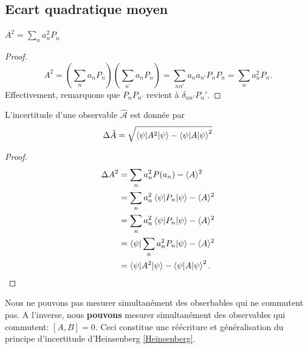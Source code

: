 \documentclass[../notesdecours.tex]{subfiles}
\begin{document}
\subsection{Ecart quadratique moyen}
\begin{lemma}
$A^2 = \sum_n a_n^2P_n$
\end{lemma}
\begin{proof}
\begin{equation*}
A^2 = (\sum_n a_nP_n)(\sum_{n'} a_nP_n) = \sum_{nn'} a_na_{n'}P_nP_{n} = \sum_n a_n^2P_n.
\end{equation*}
Effectivement, remarquons que $P_nP_{n'}$ revient à $\delta_{nn'}P_n'$.
\end{proof}

\begin{Property}
	L'incertitude d'une observable $\mathcal{\hat{A}}$ est donnée par
	\begin{equation}
		\Delta \hat{A} = \sqrt{\braket{\psi|A^2|\psi} - \braket{\psi|A|\psi}^2}
	\end{equation}
\end{Property}
\begin{proof}
	\begin{align*}
		\Delta A^2 &= \sum_n a_n^2 P(a_n) - \langle A\rangle^2\\
		&= \sum_n a_n^2 \braket{\psi|P_n|\psi} - \langle A\rangle^2\\
		&= \sum_n a_n^2 \braket{\psi|P_n|\psi} - \langle A\rangle^2\\
		&= \braket{\psi|\sum_n a_n^2 P_n|\psi} - \langle A\rangle^2\\
		&= \braket{\psi|A^2|\psi} - \braket{\psi|A|\psi}^2.
		\end{align*}	
\end{proof}

\begin{remark} Nous ne pouvons pas mesurer simultanément des obserbables qui ne commutent pas. A l'inverse, nous \textbf{pouvons} mesurer simultanément des observables qui commutent: $[A,B] = 0$. Ceci constitue une réécriture et généralisation du principe d'incertitude d'Heinsenberg \eqref{Heinsenberg}.\end{remark}

\begin{center}
\end{center}
\end{document}

